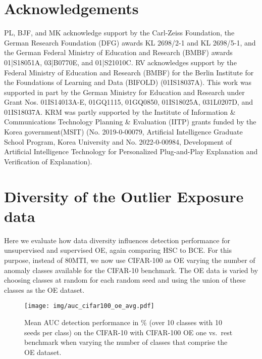 \documentclass[10pt]{article} \usepackage[accepted]{stylefiles/tmlr}
\begin{document}
\section{Acknowledgements}
PL, BJF, and MK acknowledge support by the Carl-Zeiss Foundation, the German Research Foundation (DFG) awards KL 2698/2-1 and KL 2698/5-1, and the German Federal Ministry of Education and Research (BMBF) awards 01|S18051A, 03|B0770E, and 01|S21010C.
RV acknowledges support by the Federal Ministry of Education and Research (BMBF) for the Berlin Institute for the Foundations of Learning and Data (BIFOLD) (01IS18037A).
This work was supported in part by the German Ministry for Education and Research under Grant Nos. 01IS14013A-E, 01GQ1115, 01GQ0850, 01IS18025A, 031L0207D, and 01IS18037A. 
KRM was partly supported by the Institute of Information \& Communications Technology Planning \& Evaluation (IITP) grants funded by the Korea government(MSIT) (No. 2019-0-00079, Artificial Intelligence Graduate School Program, Korea University and No. 2022-0-00984, Development of Artificial Intelligence Technology for Personalized Plug-and-Play Explanation and Verification of Explanation).









\clearpage
\appendix

\makeatletter
\setlength{\@fptop}{0pt}
\makeatother



\section{Diversity of the Outlier Exposure data}
\label{appx:oe_diversity}
Here we evaluate how data diversity influences detection performance for unsupervised and supervised OE, again comparing HSC to BCE.
For this purpose, instead of 80MTI, we now use CIFAR-100 as OE varying the number of anomaly classes available for the CIFAR-10 benchmark. 
The OE data is varied by choosing  classes at random for each random seed and using the union of these classes as the OE dataset.

\begin{figure}[htb]
  \centering \small
  \texttt{[image: img/auc\_cifar100\_oe\_avg.pdf]}
  \caption{Mean AUC detection performance in \% (over 10 classes with 10 seeds per class) on the CIFAR-10 with CIFAR-100 OE one vs.~rest benchmark when varying the number of  classes that comprise the OE dataset.}
  \label{fig:oe_diversity}
\end{figure}
\end{document}
